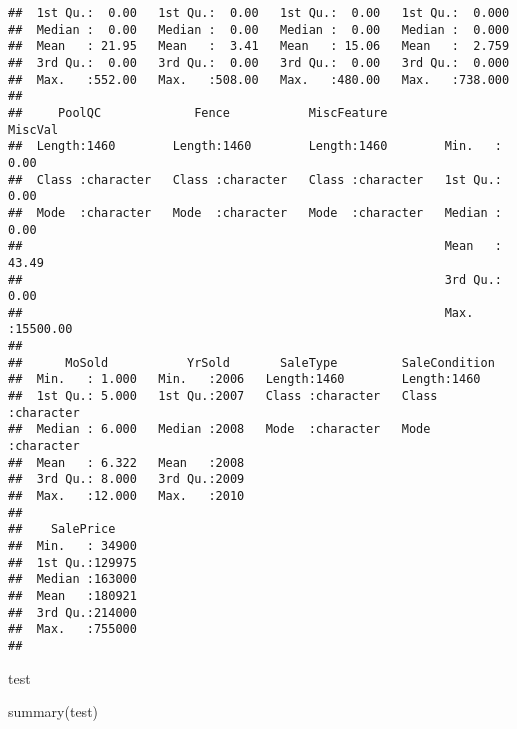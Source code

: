 \documentclass[
]{article}
\newenvironment{Shaded}{\begin{snugshade}}{\end{snugshade}}
\newcommand{\FunctionTok}[1]{\textcolor[rgb]{0.00,0.00,0.00}{#1}}
\newcommand{\NormalTok}[1]{#1}
\begin{document}
\begin{verbatim}
##  1st Qu.:  0.00   1st Qu.:  0.00   1st Qu.:  0.00   1st Qu.:  0.000  
##  Median :  0.00   Median :  0.00   Median :  0.00   Median :  0.000  
##  Mean   : 21.95   Mean   :  3.41   Mean   : 15.06   Mean   :  2.759  
##  3rd Qu.:  0.00   3rd Qu.:  0.00   3rd Qu.:  0.00   3rd Qu.:  0.000  
##  Max.   :552.00   Max.   :508.00   Max.   :480.00   Max.   :738.000  
##                                                                      
##     PoolQC             Fence           MiscFeature           MiscVal        
##  Length:1460        Length:1460        Length:1460        Min.   :    0.00  
##  Class :character   Class :character   Class :character   1st Qu.:    0.00  
##  Mode  :character   Mode  :character   Mode  :character   Median :    0.00  
##                                                           Mean   :   43.49  
##                                                           3rd Qu.:    0.00  
##                                                           Max.   :15500.00  
##                                                                             
##      MoSold           YrSold       SaleType         SaleCondition     
##  Min.   : 1.000   Min.   :2006   Length:1460        Length:1460       
##  1st Qu.: 5.000   1st Qu.:2007   Class :character   Class :character  
##  Median : 6.000   Median :2008   Mode  :character   Mode  :character  
##  Mean   : 6.322   Mean   :2008                                        
##  3rd Qu.: 8.000   3rd Qu.:2009                                        
##  Max.   :12.000   Max.   :2010                                        
##                                                                       
##    SalePrice     
##  Min.   : 34900  
##  1st Qu.:129975  
##  Median :163000  
##  Mean   :180921  
##  3rd Qu.:214000  
##  Max.   :755000  
## 
\end{verbatim}

test

\begin{Shaded}
\begin{Highlighting}[]
\FunctionTok{summary}\NormalTok{(test)}
\end{Highlighting}
\end{Shaded}
\end{document}
